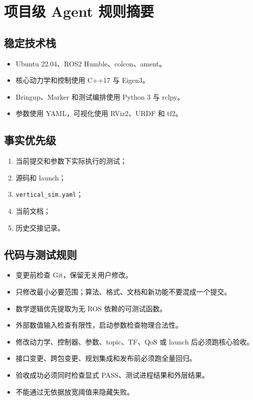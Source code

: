 \documentclass[UTF8,a4paper,12pt,fontset=fandol]{ctexart}
\newcommand{\code}[1]{\texttt{#1}}
\begin{document}
\section{项目级 Agent 规则摘要}

\subsection{稳定技术栈}

\begin{itemize}
  \item Ubuntu 22.04、ROS2 Humble、colcon、ament。
  \item 核心动力学和控制使用 C++17 与 Eigen3。
  \item Bringup、Marker 和测试编排使用 Python 3 与 rclpy。
  \item 参数使用 YAML，可视化使用 RViz2、URDF 和 tf2。
\end{itemize}

\subsection{事实优先级}

\begin{enumerate}
  \item 当前提交和参数下实际执行的测试；
  \item 源码和 launch；
  \item \code{vertical\_sim.yaml}；
  \item 当前文档；
  \item 历史交接记录。
\end{enumerate}

\subsection{代码与测试规则}

\begin{itemize}
  \item 变更前检查 Git，保留无关用户修改。
  \item 只修改最小必要范围；算法、格式、文档和新功能不要混成一个提交。
  \item 数学逻辑优先提取为无 ROS 依赖的可测试函数。
  \item 外部数值输入检查有限性，启动参数检查物理合法性。
  \item 修改动力学、控制器、参数、topic、TF、QoS 或 launch 后必须跑核心验收。
  \item 接口变更、跨包变更、规划集成和发布前必须跑全量回归。
  \item 验收成功必须同时检查显式 PASS、测试进程结果和外层结果。
  \item 不能通过无依据放宽阈值来隐藏失败。
\end{itemize}
\end{document}
